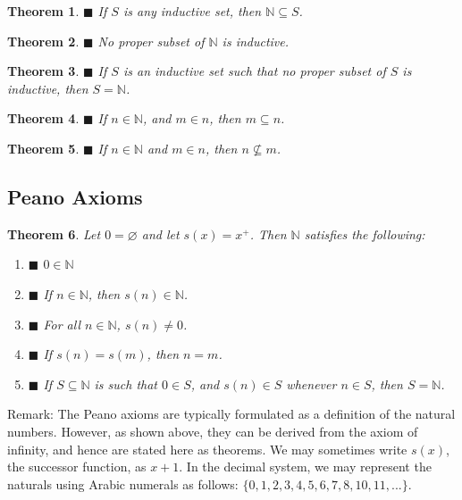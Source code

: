 \documentclass[a4paper]{article}
\newtheorem{mytheorem}{Theorem}
\numberwithin{mytheorem}{section}
\numberwithin{mydef}{section}
\numberwithin{axiom}{section}
\numberwithin{example}{section}
\newcommand{\done}{$\blacksquare$ }
\begin{document}
\begin{mytheorem} \done If $S$ is any inductive set, then $\mathbb{N} \subseteq S$. 
\end{mytheorem}

\begin{mytheorem} \done No proper subset of $\mathbb{N}$ is inductive. 
\end{mytheorem}

\begin{mytheorem} \done If $S$ is an inductive set such that no proper subset of $S$ is inductive, then $S = \mathbb{N}$. 
\end{mytheorem}

\begin{mytheorem} \done If $n \in \mathbb{N}$, and $m \in n$, then $m \subseteq n$.
\end{mytheorem}

\begin{mytheorem} \done If $n \in \mathbb{N}$ and $m \in n$, then $n \not\subseteq m$.
\end{mytheorem}

\subsection{Peano Axioms}

\begin{mytheorem} Let $0 = \varnothing$ and let $s(x) = x^{+}$. Then $\mathbb{N}$ satisfies the following:
\begin{enumerate}
\item \done $0 \in \mathbb{N}$
\item \done If $n \in \mathbb{N}$, then $s(n) \in \mathbb{N}$.
\item \done For all $n \in \mathbb{N}$, $s(n) \neq 0$.
\item \done If $s(n) = s(m)$, then $n = m$. 
\item \done If $S \subseteq \mathbb{N}$ is such that $0 \in S$, and $s(n) \in S$ whenever $n \in S$, then $S = \mathbb{N}$.
\end{enumerate}
\end{mytheorem}

Remark: The Peano axioms are typically formulated as a definition of the natural numbers. However, as shown above, they can be derived from the axiom of infinity, and hence are stated here as theorems. We may sometimes write $s(x)$, the successor function, as $x + 1$. In the decimal system, we may represent the naturals using Arabic numerals as follows: $\{0,1,2,3,4,5,6,7,8,10,11,... \}$. 
\end{document}

